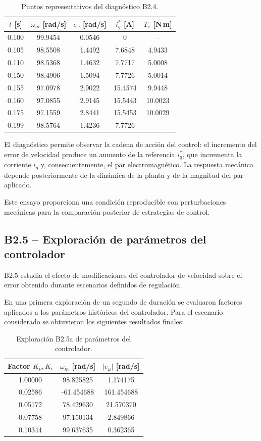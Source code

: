 \begin{table}[H]
\centering
\caption{Puntos representativos del diagnóstico B2.4.}
\label{tab:b2_4_diagnostico}
\begin{tabular}{ccccc}
\toprule
\(t\) [s] & \(\omega_m\) [rad/s] & \(e_\omega\) [rad/s] & \(i_q^*\) [A] & \(T_e\) [N\,m] \\
\midrule
0.100 & 99.9454 & 0.0546 & 0 & -- \\
0.105 & 98.5508 & 1.4492 & 7.6848 & 4.9433 \\
0.110 & 98.5368 & 1.4632 & 7.7717 & 5.0008 \\
0.150 & 98.4906 & 1.5094 & 7.7726 & 5.0014 \\
0.155 & 97.0978 & 2.9022 & 15.4574 & 9.9448 \\
0.160 & 97.0855 & 2.9145 & 15.5443 & 10.0023 \\
0.175 & 97.1559 & 2.8441 & 15.5453 & 10.0029 \\
0.199 & 98.5764 & 1.4236 & 7.7726 & -- \\
\bottomrule
\end{tabular}
\end{table}

El diagnóstico permite observar la cadena de acción del control: el incremento del error de velocidad produce un aumento de la referencia \(i_q^*\), que incrementa la corriente \(i_q\) y, consecuentemente, el par electromagnético. La respuesta mecánica depende posteriormente de la dinámica de la planta y de la magnitud del par aplicado.

Este ensayo proporciona una condición reproducible con perturbaciones mecánicas para la comparación posterior de estrategias de control.

\subsection{B2.5 -- Exploración de parámetros del controlador}

B2.5 estudia el efecto de modificaciones del controlador de velocidad sobre el error obtenido durante escenarios definidos de regulación.

En una primera exploración de un segundo de duración se evaluaron factores aplicados a los parámetros históricos del controlador. Para el escenario considerado se obtuvieron los siguientes resultados finales:

\begin{table}[H]
\centering
\caption{Exploración B2.5a de parámetros del controlador.}
\label{tab:b2_5a}
\begin{tabular}{ccc}
\toprule
\textbf{Factor \(K_p,K_i\)} & \(\omega_m\) [rad/s] & \(|e_\omega|\) [rad/s] \\
\midrule
1.00000 & 98.825825 & 1.174175 \\
0.02586 & -61.454688 & 161.454688 \\
0.05172 & 78.429630 & 21.570370 \\
0.07758 & 97.150134 & 2.849866 \\
0.10344 & 99.637635 & 0.362365 \\
\bottomrule
\end{tabular}
\end{table}

